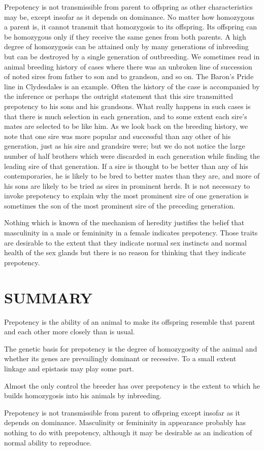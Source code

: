 Prepotency is not transmissible from parent to offspring as other
characteristics may be, except insofar as it depends on dominance. No
matter how homozygous a parent is, it cannot transmit that homozygosis
to its offspring. Its offspring can be homozygous only if they
receive the same genes from both parents. A high degree of homozygosis
can be attained only by many generations of inbreeding but can be
destroyed by a single generation of outbreeding. We sometimes read in
animal breeding history of cases where there was an unbroken line of
succession of noted sires from father to son and to grandson, and so on.
The Baron's Pride line in Clydesdales is an example. Often the history
of the case is accompanied by the inference or perhaps the outright
statement that this sire transmitted prepotency to his sons and his
grandsons. What really happens in such cases is that there is much selection
in each generation, and to some extent each sire's mates are selected
to be like him. As we look back on the breeding history, we note
that one sire was more popular and successful than any other of his
generation, just as his sire and grandsire were; but we do not notice the
large number of half brothers which were discarded in each generation
while finding the leading sire of that generation. If a sire is thought to
be better than any of his contemporaries, he is likely to be bred to better
mates than they are, and more of his sons are likely to be tried as sires in
prominent herds. It is not necessary to invoke prepotency to explain
why the most prominent sire of one generation is sometimes the son of
the most prominent sire of the preceding generation.

Nothing which is known of the mechanism of heredity justifies the
belief that masculinity in a male or femininity in a female indicates
prepotency. Those traits are desirable to the extent that they indicate
normal sex instincts and normal health of the sex glands but there is
no reason for thinking that they indicate prepotency.

\section*{SUMMARY}

Prepotency is the ability of an animal to make its offspring resemble
that parent and each other more closely than is usual.

The genetic basis for prepotency is the degree of homozygosity of
the animal and whether its genes are prevailingly dominant or recessive.
To a small extent linkage and epistasis may play some part.

Almost the only control the breeder has over prepotency is the
extent to which he builds homozygosis into his animals by inbreeding.

Prepotency is not transmissible from parent to offspring except insofar
as it depends on dominance. Masculinity or femininity in appearance
probably has nothing to do with prepotency, although it may be
desirable as an indication of normal ability to reproduce.
